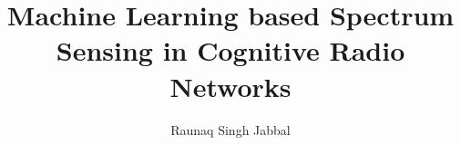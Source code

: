 \documentclass[defaultstyle,11pt]{thesis}
\title{Machine Learning based Spectrum Sensing in Cognitive Radio Networks}
\author{Raunaq Singh Jabbal}
\begin{document}








\nocite{*}		%

% 
\end{document}
